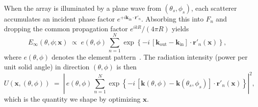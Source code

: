 \documentclass[11pt,letterpaper]{article}
\theoremstyle{definition}
\theoremstyle{plain}
\begin{document}
When the array is illuminated by a plane wave from $(\theta_s,\phi_s)$, each scatterer accumulates an incident phase factor $e^{+i\mathbf{k}_{\mathrm{in}}\cdot\mathbf{r}'_n}$. Absorbing this into $F_n$ and dropping the common propagation factor $e^{ikR}/(4\pi R)$ yields
\begin{equation}
E_{\infty}(\theta,\phi;\bm{x}) \;\propto\; e(\theta,\phi)\,
\sum_{n=1}^N \exp\!\left\{-i\,[\mathbf{k}_{\mathrm{out}}-\mathbf{k}_{\mathrm{in}}]\cdot\mathbf{r}'_n(\bm{x})\right\},
\label{eq:AF}
\end{equation}
where $e(\theta,\phi)$ denotes the element pattern~\cite{Balanis2016,Mailloux2017_PhasedArrayBook,HuangEncinar2007}. The radiation intensity (power per unit solid angle) in direction $(\theta,\phi)$ is then
\begin{equation}
U(\bm{x},(\theta,\phi)) \;=\;
\left|\, e(\theta,\phi)\, \sum_{n=1}^N
\exp\!\left\{-i\,[\mathbf{k}(\theta,\phi)-\mathbf{k}(\theta_s,\phi_s)]\cdot\mathbf{r}'_n(\bm{x})\right\}
\right|^2,
\label{eq:Udef}
\end{equation}
which is the quantity we shape by optimizing $\mathbf{x}$.

\end{document}
